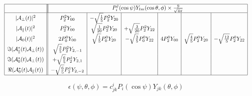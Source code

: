 \documentclass[a4paper,9pt,twoside]{article}
\begin{document}
\begin{equation}
\begin{array}{|c|| c | c | c | c | c | c |}
 \hline
&\multicolumn{6}{|c|}{ P_i^j(\cos\psi)Y_{lm}(\cos\theta,\phi) \times \frac{9}{\sqrt{4\pi}} } \\
 \hline
|{\cal A}_\perp(t)|^2                   &  P_2^2 Y_{00} & -\sqrt{\frac{1}{5}} P_2^2 Y_{20} &                                 &&& \\
|{\cal A}_\parallel(t)|^2               &  P_2^2 Y_{00} &  \sqrt{\frac{1}{20}} P_2^2 Y_{20} & +\sqrt{\frac{3}{20}} P_2^2Y_{22} & && \\
|{\cal A}_0(t)|^2                       &  2 P_0^0Y_{00}  & \sqrt{\frac{1}{5}} P_0^0 Y_{20} & -\sqrt{\frac{3}{5}} P_0^0 Y_{22}
                                        &  4 P_2^0Y_{00}  & \sqrt{\frac{4}{5}} P_2^0 Y_{20} & -\sqrt{\frac{12}{5}} P_2^0 Y_{22} \\
\Im({\cal A}_\parallel^*(t){\cal A}_\perp(t)) &  \sqrt{\frac{3}{5}} P_2^2 Y_{2,-1} &&&&&\\
\Im({\cal A}_0^*(t){\cal A}_\perp(t))         & +\sqrt{\frac{6}{5}} P_2^1 Y_{2,1} &&&&&\\
\Re({\cal A}_0^*(t){\cal A}_\parallel(t))     & -\sqrt{\frac{6}{5}} P_2^1 Y_{2,-2} &&&&&\\
 \hline
\end{array}
\end{equation}



\pagebreak
\begin{equation}
   \epsilon(\psi,\theta,\phi) = c^{i}_{jk} P_i(\cos\psi)Y_{jk}(\theta,\phi)
   \label{eq:eps_exp}
\end{equation}
\end{document}
